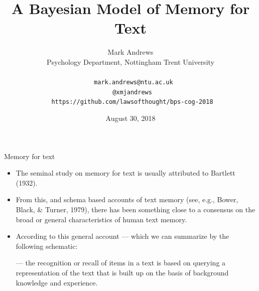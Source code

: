 \documentclass[10pt,ignorenonframetext,]{beamer}
\title{A Bayesian Model of Memory for Text}
\author{Mark Andrews\\
Psychology Department, Nottingham Trent University\\
~\\
\faEnvelopeO~ \texttt{mark.andrews@ntu.ac.uk}\\
\faTwitter~\texttt{@xmjandrews}\\
\faGithub~\texttt{https://github.com/lawsofthought/bps-cog-2018}}
\date{August 30, 2018}
\providecommand{\tightlist}{%
  \setlength{\itemsep}{0pt}\setlength{\parskip}{0pt}}
\begin{document}
\frame{\titlepage}

\begin{frame}{Memory for text}
\protect\hypertarget{memory-for-text}{}

\begin{itemize}
\tightlist
\item
  The seminal study on memory for text is usually attributed to Bartlett
  (1932).
\item
  From this, and schema based accounts of text memory (see, e.g., Bower,
  Black, \& Turner, 1979), there has been something close to a consensus
  on the broad or general characteristics of human text memory.
\item
  According to this general account --- which we can summarize by the
  following schematic:

  \begin{center}
  \end{center}

  --- the recognition or recall of items in a text is based on querying
  a representation of the text that is built up on the basis of
  background knowledge and experience.
\end{itemize}

\end{frame}
\end{document}

